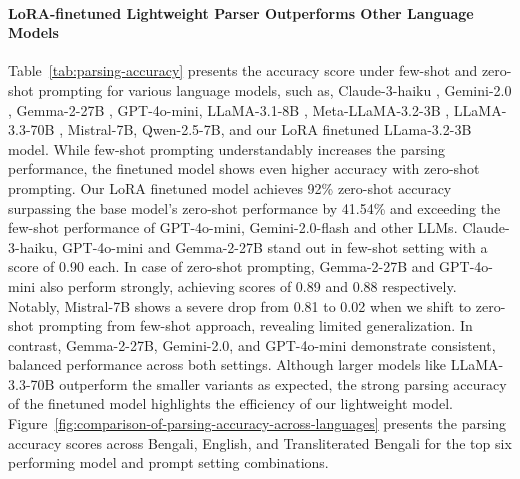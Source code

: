\documentclass[11pt]{article}
\begin{document}
\paragraph{LoRA-finetuned Lightweight Parser Outperforms Other Language Models}
Table~\ref{tab:parsing-accuracy} presents the accuracy score under few-shot and zero-shot prompting for various language models, such as, Claude-3-haiku \cite{claude3haiku}, Gemini-2.0 \cite{gemini2}, Gemma-2-27B \cite{gemma2_27b}, GPT-4o-mini, LLaMA-3.1-8B \cite{meta_llama3_8b}, Meta-LLaMA-3.2-3B \cite{meta_llama3_3b}, LLaMA-3.3-70B \cite{meta_llama3_70b}, Mistral-7B, Qwen-2.5-7B, and our LoRA finetuned LLama-3.2-3B model. While few-shot prompting understandably increases the parsing performance, the finetuned model shows even higher accuracy with zero-shot prompting. Our LoRA finetuned model achieves 92\% zero-shot accuracy surpassing the base model's zero-shot performance by 41.54\% and exceeding the few-shot performance of GPT-4o-mini, Gemini-2.0-flash and other LLMs. Claude-3-haiku, GPT-4o-mini and Gemma-2-27B stand out in few-shot setting with a score of 0.90 each. In case of zero-shot prompting, Gemma-2-27B and GPT-4o-mini also perform strongly, achieving scores of 0.89 and 0.88 respectively. Notably, Mistral-7B shows a severe drop from 0.81 to 0.02 when we shift to zero-shot prompting from few-shot approach, revealing limited generalization. In contrast, Gemma-2-27B, Gemini-2.0, and GPT-4o-mini demonstrate consistent, balanced performance across both settings. Although larger models like LLaMA-3.3-70B outperform the smaller variants as expected, the strong parsing accuracy of the  finetuned model highlights the efficiency of our lightweight model. Figure~\ref{fig:comparison-of-parsing-accuracy-across-languages} presents the parsing accuracy scores across Bengali, English, and Transliterated Bengali for the top six performing model and prompt setting combinations.
\end{document}
